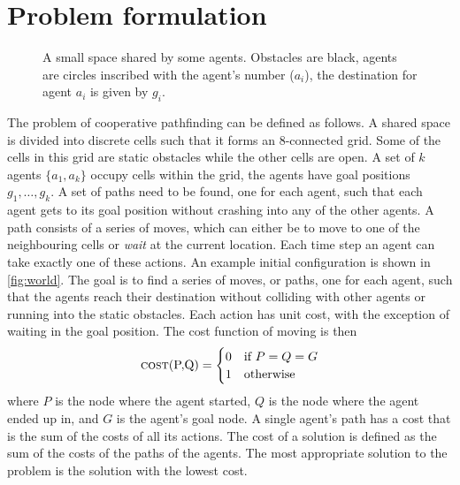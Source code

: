 \section{Problem formulation}\label{sec:problem}

\begin{figure}[t]
    \centering
    \def\svgscale{.7}
    
    \caption{A small space shared by some agents. Obstacles are black, agents
        are circles inscribed with the agent's number ($a_i$), the destination
        for
        agent $a_i$ is given by $g_i$.}
    \label{fig:world}
\end{figure}

The problem of cooperative pathfinding can be defined as follows.
A shared space is divided into discrete cells such that it forms an 8-connected
grid. Some of the cells in this grid are static obstacles while the other cells
are open. A set of $k$ agents $\{a_1, a_k\}$ occupy cells within the grid, the
agents have goal positions $g_1, \ldots, g_k$. A set of paths need to be found,
one for each agent, such that each agent gets to its goal position without
crashing into any of the other agents.
A path consists of a series of moves, which can either
be to move to one of the neighbouring cells or \emph{wait} at the current
location. Each time step an agent can take exactly one of these actions.
An example initial configuration is shown in \autoref{fig:world}. The goal is
to find a series of moves, or paths, one for each agent, such that the agents
reach their destination without colliding with other agents or running into the
static obstacles. Each action has unit cost, with the exception of waiting in
the goal position. The cost function of moving is then
\[
\text{\textsc{cost}(P,Q)} =
\begin{cases}
    0 & \text{if } P = Q = G \\
    1 & \text{otherwise}
\end{cases}
\]
where $P$ is the node where the agent started, $Q$ is the node where the agent
ended up in, and $G$ is the agent's goal node. A single agent's path has a cost
that is the sum of the costs of all its actions. The cost of a solution is
defined as the sum of the costs of the paths of the agents. The most
appropriate solution to the problem is the solution with the lowest cost.

